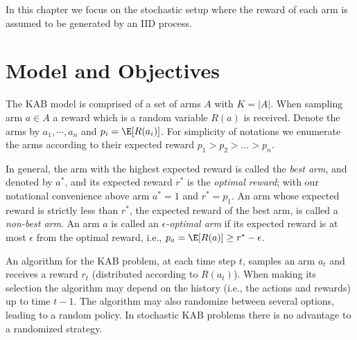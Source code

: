 In this chapter we focus on the stochastic setup where the reward of each arm is assumed to be generated by an IID process.


\section{Model and Objectives}


The KAB model is  comprised of a set of arms
$A$ with $K=|A|$. When sampling arm $a\in A$ a reward which is a
random variable $R(a)$ is received.
Denote the arms by $a_1, \cdots , a_n$ and $p_i =\E[R(a_i)]$.
For simplicity of notations we enumerate the arms according to
their expected reward $p_1 > p_2>...>p_n$.

In general, the arm with the highest expected reward is called the {\em best
arm}, and denoted by $a^*$, and its expected reward $r^*$ is the
{\em optimal reward}; with our notational convenience above arm $a^* = 1$ and $ r^* = p_1$. An arm whose expected reward is strictly
less than $r^*$, the expected reward of the best arm, is called a
{\em non-best arm}. An arm $a$ is called an {\em
$\epsilon$-optimal arm} if its expected reward is at most
$\epsilon$ from the optimal reward, i.e., $p_a = \E[R(a)] \geq r^*
-\epsilon$.

An algorithm for the KAB problem, at each time step
$t$, samples an arm $a_t$ and receives a reward $r_t$ (distributed
according to $R(a_t)$). When making its selection the algorithm
may depend on the history (i.e., the actions and rewards) up to
time $t-1$. The algorithm may also randomize between several options, leading to a random policy.
In stochastic KAB problems there is no advantage to a randomized strategy.


